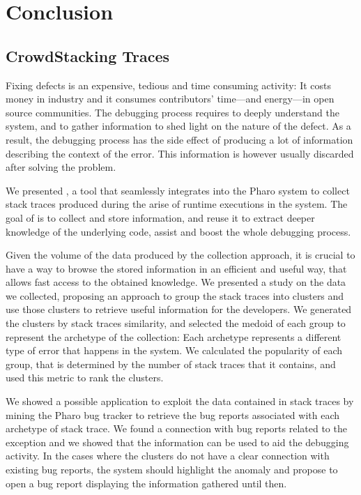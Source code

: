 \section{Conclusion}\label{sec:conclusion}

\subsection{CrowdStacking Traces}

Fixing defects is an expensive, tedious and time consuming activity: It costs money in industry and it consumes contributors' time---and energy---in open source communities. The debugging process requires to deeply understand the system, and to gather information to shed light on the nature of the defect. As a result, the debugging process has the side effect of producing a lot of information describing the context of the error. This information is however usually discarded after solving the problem.

We presented \shr, a tool that seamlessly integrates into the Pharo system to collect stack traces produced during the arise of runtime executions in the system. The goal of \shr is to collect and store information, and reuse it to extract deeper knowledge of the underlying code, assist and boost the whole debugging process.

Given the volume of the data produced by the collection approach, it is crucial to have a way to browse the stored information in an efficient and useful way, that allows fast access to the obtained knowledge. We presented a study on the data we collected, proposing an approach to group the stack traces into clusters and use those clusters to retrieve useful information for the developers. We generated the clusters by stack traces similarity, and selected the medoid of each group to represent the archetype of the collection: Each archetype represents a different type of error that happens in the system. We calculated the popularity of each group, that is determined by the number of stack traces that it contains, and used this metric to rank the clusters.

We showed a possible application to exploit the data contained in stack traces by mining the Pharo bug tracker to retrieve the bug reports associated with each archetype of stack trace. We found a connection with bug reports related to the exception and we showed that the information can be used to aid the debugging activity. In the cases where the clusters do not have a clear connection with existing bug reports, the system should highlight the anomaly and propose to open a bug report displaying the information gathered until then.

